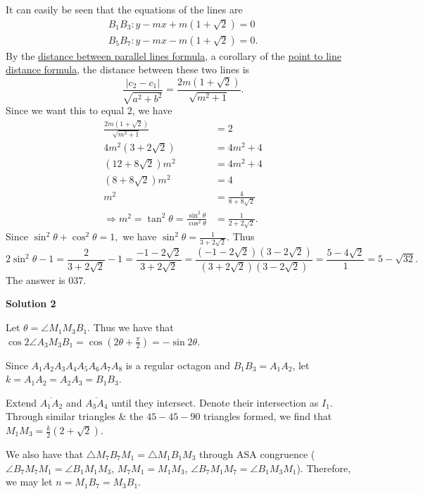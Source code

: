 \begin{enumerate}
 It can easily be seen that the equations of the lines are 
 \begin{align*} B_{1}B_{3}: y-mx+m\left(1+\sqrt{2}\right)=0 \\ B_{5}B_{7}: y-mx-m\left(1+\sqrt{2}\right)=0.\end{align*}
 By the \href{https://www.cuemath.com/geometry/distance-between-two-lines/}{distance between parallel lines formula}, a corollary of the \href{https://brilliant.org/wiki/dot-product-distance-between-point-and-a-line/}{point to line distance formula}, the distance between these two lines is 
 \[\frac{|c_{2}-c_{1}|}{\sqrt{a^{2}+b^{2}}}=\frac{2m\left(1+\sqrt{2}\right)}{\sqrt{m^{2}+1}}.\] Since we want this to equal $2$, we have 
 \begin{align*}\frac{2m\left(1+\sqrt{2}\right)}{\sqrt{m^{2}+1}}&=2 \\ 4m^{2}\left(3+2\sqrt{2}\right)&=4m^{2}+4 \\ \left(12+8\sqrt{2}\right)m^{2}&=4m^{2}+4 \\ \left(8+8\sqrt{2}\right)m^{2}&=4 \\ m^{2}&=\frac{4}{8+8\sqrt{2}} \\ \Rightarrow m^{2}=\tan^{2}\theta=\frac{\sin^{2}\theta}{\cos^{2}\theta}&=\frac{1}{2+2\sqrt{2}}.\end{align*}
 Since $\sin^{2}\theta+\cos^{2}\theta=1,$ we have $\sin^{2}\theta=\frac{1}{3+2\sqrt{2}}$. Thus 
 \[2\sin^{2}\theta-1=\frac{2}{3+2\sqrt{2}}-1=\frac{-1-2\sqrt{2}}{3+2\sqrt{2}}=\frac{\left(-1-2\sqrt{2}\right)\left(3-2\sqrt{2}\right)}{\left(3+2\sqrt{2}\right)\left(3-2\sqrt{2}\right)}=\frac{5-4\sqrt{2}}{1}=5-\sqrt{32}.\] The answer is $\boxed{037}$.

 


 



\textbf{Solution 2}

Let $\theta=\angle M_1 M_3 B_1$. Thus we have that $\cos 2 \angle A_3 M_3 B_1=\cos \left(2\theta + \frac{\pi}{2} \right)=-\sin2\theta$.

 Since $A_1 A_2 A_3 A_4 A_5 A_6 A_7 A_8$ is a regular octagon and $B_1 B_3 = A_1 A_2$, let $k=A_1 A_2 = A_2 A_3 = B_1 B_3$.

 
Extend $\overline{A_1 A_2}$ and $\overline{A_3 A_4}$ until they intersect. Denote their intersection as $I_1$. Through similar triangles & the $45-45-90$ triangles formed, we find that $M_1 M_3=\frac{k}{2}(2+\sqrt2)$.

 We also have that $\triangle M_7 B_7 M_1 =\triangle M_1 B_1 M_3$ through ASA congruence ($\angle B_7 M_7 M_1 =\angle B_1 M_1 M_3$, $M_7 M_1 = M_1 M_3$, $\angle B_7 M_1 M_7 =\angle B_1 M_3 M_1$). Therefore, we may let $n=M_1 B_7 = M_3 B_1$.


\end{enumerate}
